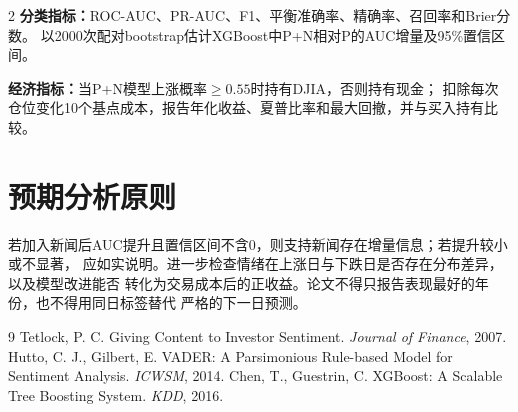 \documentclass[UTF8,a4paper,10pt,fontset=none]{ctexart}
\newcommand{\key}[1]{\textbf{#1}}
\begin{document}
\begin{multicols}{2}
\key{分类指标：}ROC-AUC、PR-AUC、F1、平衡准确率、精确率、召回率和Brier分数。
以2000次配对bootstrap估计XGBoost中P+N相对P的AUC增量及95\%置信区间。

\key{经济指标：}当P+N模型上涨概率$\geq0.55$时持有DJIA，否则持有现金；
扣除每次仓位变化10个基点成本，报告年化收益、夏普比率和最大回撤，并与买入持有比较。

\section{预期分析原则}
若加入新闻后AUC提升且置信区间不含0，则支持新闻存在增量信息；若提升较小或不显著，
应如实说明。进一步检查情绪在上涨日与下跌日是否存在分布差异，以及模型改进能否
转化为交易成本后的正收益。论文不得只报告表现最好的年份，也不得用同日标签替代
严格的下一日预测。
\end{multicols}

\vspace{-0.6em}
\begin{thebibliography}{9}\small
{} Tetlock, P. C. Giving Content to Investor Sentiment. \emph{Journal of Finance}, 2007.
 Hutto, C. J., Gilbert, E. VADER: A Parsimonious Rule-based Model for Sentiment Analysis. \emph{ICWSM}, 2014.
 Chen, T., Guestrin, C. XGBoost: A Scalable Tree Boosting System. \emph{KDD}, 2016.
\end{thebibliography}
\end{document}
